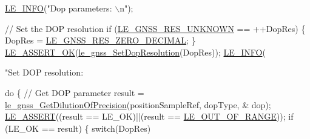 \begin{DoxyCodeInclude}
{{{{{{{{{{{{{{{{    \hyperlink{le__log_8h_a23e6d206faa64f612045d688cdde5808}{LE\_INFO}(\textcolor{stringliteral}{"Dop parameters: \(\backslash\)n"});

    \textcolor{comment}{// Set the DOP resolution}
    \textcolor{keywordflow}{if} (\hyperlink{le__gnss__interface_8h_aaf5d256c75737a2189c8da7bfed5da0dac09593667cfb123368ea6890f081ade9}{LE\_GNSS\_RES\_UNKNOWN} == ++DopRes)
    \{
        DopRes = \hyperlink{le__gnss__interface_8h_aaf5d256c75737a2189c8da7bfed5da0da17a6752c8b3a5f04e6e32503eb8336ab}{LE\_GNSS\_RES\_ZERO\_DECIMAL};
    \}
    \hyperlink{le__log_8h_a7cd2daa3d4af1de4d29e0eed95187484}{LE\_ASSERT\_OK}(\hyperlink{le__gnss__interface_8h_ae7345052efc38f199989aafcd27224e2}{le\_gnss\_SetDopResolution}(DopRes));
    \hyperlink{le__log_8h_a23e6d206faa64f612045d688cdde5808}{LE\_INFO}(\textcolor{stringliteral}{"Set DOP resolution: %

    \textcolor{keywordflow}{do}
    \{
        \textcolor{comment}{// Get DOP parameter}
        result = \hyperlink{le__gnss__interface_8h_a87cbadea6fe7ebd8ef74d45bdeef1416}{le\_gnss\_GetDilutionOfPrecision}(positionSampleRef, dopType, &
      dop);
        \hyperlink{le__log_8h_ac0dbbef91dc0fed449d0092ff0557b39}{LE\_ASSERT}((result == LE\_OK)||(result == \hyperlink{le__basics_8h_a1cca095ed6ebab24b57a636382a6c86caef8ecf11fa8556fd2d3ca8faab697717}{LE\_OUT\_OF\_RANGE}));
        \textcolor{keywordflow}{if} (LE\_OK == result)
        \{
            \textcolor{keywordflow}{switch}(DopRes)

}}}}}}}}}}}}}}}}}
\end{DoxyCodeInclude}
